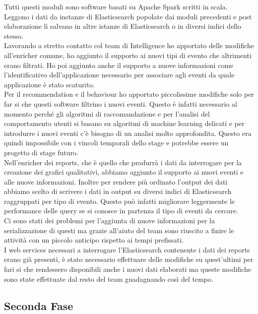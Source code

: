 \documentclass[a4paper, 12pt, twoside, openright]{book}
\begin{document}
Tutti questi moduli sono software basati su Apache Spark scritti in scala. Leggono i dati da instanze di Elasticsearch popolate dai moduli precedenti e post elaborazione li salvano in altre istanze di Elasticsearch o in diversi indici dello stesso.\\
Lavorando a stretto contatto col team di Intelligence ho apportato delle modifiche all'enricher comune, ho aggiunto il supporto ai nuovi tipi di evento che altrimenti erano filtrati. Ho poi aggiunto anche il supporto a nuove informazioni come l'identificativo dell'applicazione necessario per associare agli eventi da quale applicazione è stato scaturito.\\
Per il recommendation e il behaviour ho apportato piccolissime modifiche solo per far si che questi software filtrino i nuovi eventi. Questo è infatti necessario al momento perché gli algoritmi di raccomandazione e per l'analisi del comportamento utenti si basano su algoritmi di machine learning delicati e per introdurre i nuovi eventi c'è bisogno di un analisi molto approfondita. Questo era quindi impossibile con i vincoli temporali dello stage e potrebbe essere un progetto di stage futuro.\\
Nell'enricher dei reports, che è quello che produrrà i dati da interrogare per la creazione dei grafici qualitativi, abbiamo aggiunto il supporto ai nuovi eventi e alle nuove informazioni. Inoltre per rendere più ordinato l'output dei dati abbiamo scelto di scrivere i dati in output su diversi indici di Elasticsearch raggruppati per tipo di evento. Questo può infatti migliorare leggermente le performance delle query se si conosce in partenza il tipo di eventi da cercare.\\
Ci sono stati dei problemi per l'aggiunta di nuove informazioni per la serializzazione di questi ma grazie all'aiuto del team sono riuscito a finire le attività con un piccolo anticipo rispetto ai tempi prefissati.\\
I web services necessari a interrogare l'Elasticsearch contenente i dati dei reports erano già presenti, è stato necessario effettuare delle modifiche su quest'ultimi per fari si che rendessero disponibili anche i nuovi dati elaborati ma queste modifiche sono state effettuate dal resto del team guadagnando così del tempo.\\

\subsection{Seconda Fase}
\end{document}
